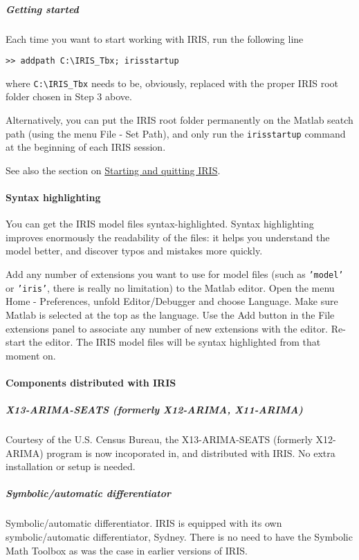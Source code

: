 \subparagraph{Getting started}\label{getting-started}

Each time you want to start working with IRIS, run the following line

\begin{verbatim}
>> addpath C:\IRIS_Tbx; irisstartup
\end{verbatim}

where \texttt{C:\textbackslash{}IRIS\_Tbx} needs to be, obviously,
replaced with the proper IRIS root folder chosen in Step 3 above.

Alternatively, you can put the IRIS root folder permanently on the
Matlab seatch path (using the menu File - Set Path), and only run the
\texttt{irisstartup} command at the beginning of each IRIS session.

See also the section on \href{config/Contents}{Starting and quitting
IRIS}.

\paragraph{Syntax highlighting}\label{syntax-highlighting}

You can get the IRIS model files syntax-highlighted. Syntax highlighting
improves enormously the readability of the files: it helps you
understand the model better, and discover typos and mistakes more
quickly.

Add any number of extensions you want to use for model files (such as
\texttt{'model'} or \texttt{'iris'}, there is really no limitation) to
the Matlab editor. Open the menu Home - Preferences, unfold
Editor/Debugger and choose Language. Make sure Matlab is selected at the
top as the language. Use the Add button in the File extensions panel to
associate any number of new extensions with the editor. Re-start the
editor. The IRIS model files will be syntax highlighted from that moment
on.

\paragraph{Components distributed with
IRIS}\label{components-distributed-with-iris}

\subparagraph{X13-ARIMA-SEATS (formerly X12-ARIMA,
X11-ARIMA)}\label{x13-arima-seats-formerly-x12-arima-x11-arima}

Courtesy of the U.S. Census Bureau, the X13-ARIMA-SEATS (formerly
X12-ARIMA) program is now incoporated in, and distributed with IRIS. No
extra installation or setup is needed.

\subparagraph{Symbolic/automatic
differentiator}\label{symbolicautomatic-differentiator}

Symbolic/automatic differentiator. IRIS is equipped with its own
symbolic/automatic differentiator, Sydney. There is no need to have the
Symbolic Math Toolbox as was the case in earlier versions of IRIS.



